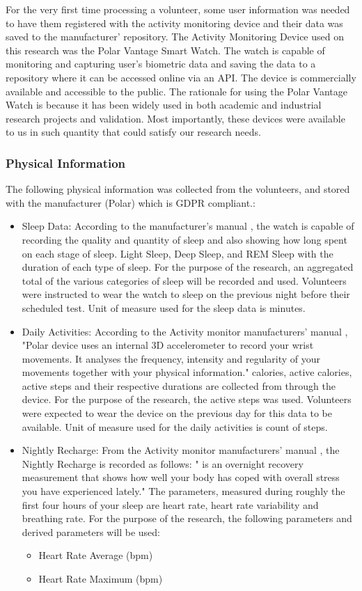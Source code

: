For the very first time processing a volunteer, some user information was needed to have them registered with the activity monitoring device and their data was saved to the manufacturer'
repository. The Activity Monitoring Device used on this research was the Polar Vantage Smart Watch. The watch is capable of monitoring and capturing user’s biometric data and saving the
data to a repository where it can be accessed online via an API. The device is commercially available and accessible to the public. The rationale for using the Polar Vantage Watch is
because it has been widely used in both academic and industrial research projects and validation. Most importantly, these devices were available to us in such quantity that could satisfy
our research needs.

\subsubsection*{Physical Information}
The following physical information was collected from the volunteers, and stored with the manufacturer (Polar) which is GDPR compliant.:
\begin{itemize}
    \item Sleep Data: According to the manufacturer's manual \cite{polarManual}, the watch is capable of recording the quality and quantity of sleep and also showing how long spent on each stage of sleep. 
    Light Sleep, Deep Sleep, and REM Sleep with the duration of each type of sleep. For the purpose of the research, an aggregated total of the various categories of sleep will be recorded and used.
    Volunteers were instructed to wear the watch to sleep on the previous night before their scheduled test. Unit of measure used for the sleep data is minutes. 
    \item Daily Activities: According to the Activity monitor manufacturers' manual \cite{polarManual}, "Polar device uses an internal 3D accelerometer to record your wrist movements. It analyses the frequency, 
    intensity and regularity of your movements together with your physical information." calories, active calories, active steps and their respective durations are collected from through the device. For the 
    purpose of the research, the active steps was used. Volunteers were expected to wear the device on the previous day for this data to be available. Unit of measure used for the daily activities is count of steps.
    \item Nightly Recharge: From the Activity monitor manufacturers' manual \cite{polarManual}, the Nightly Recharge is recorded as follows: " is an overnight recovery measurement that shows how well your body has
    coped with overall stress you have experienced lately." The parameters, measured during roughly the first four hours of your sleep are heart rate, heart rate variability and breathing rate. For the purpose 
    of the research, the following parameters and derived parameters will be used:
    \begin{itemize}
        \item Heart Rate Average (bpm)
        \item Heart Rate Maximum (bpm)
    \end{itemize}
\end{itemize}



